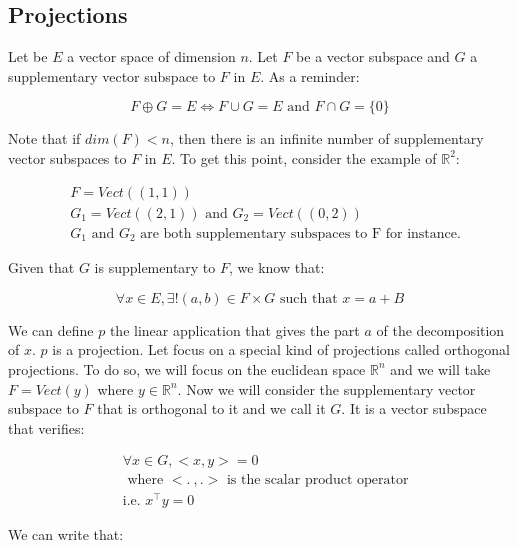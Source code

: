 \documentclass[a4paper, 12pt]{article}
\begin{document}
\subsection{Projections}

Let be $E$ a vector space of dimension $n$. Let $F$ be a vector subspace  and $G$ a supplementary vector subspace to $F$ in $E$. As a reminder:

\begin{equation}
F \oplus G = E \iff F \cup G = E \text{ and } F \cap G = \{0\}
\end{equation}

Note that if $dim(F)<n$, then there is an infinite number of supplementary vector subspaces to $F$ in $E$. To get this point, consider the example of $\mathbb{R}^{2}$:

\begin{align*}
& F = Vect((1,1)) \\
& G_1 = Vect((2,1)) \text{ and } G_2 = Vect((0, 2)) \\
& G_1 \text{ and } G_2 \text{ are both supplementary subspaces to F for instance.}
\end{align*}

Given that $G$ is supplementary to $F$, we know that:

\begin{equation}
\forall x \in E, \exists! (a, b) \in F \times G \text{ such that } x = a +B
\end{equation}

We can define $p$ the linear application that gives the part $a$ of the decomposition of $x$. $p$ is a projection. Let focus on a special kind of projections called orthogonal projections. To do so, we will focus on the euclidean space $\mathbb{R}^{n}$ and we will take $F=Vect(y)$ where $y \in \mathbb{R}^{n}$. Now we will consider the supplementary vector subspace to $F$ that is orthogonal to it and we call it $G$. It is a vector subspace that verifies:

\begin{align*}
& \forall x \in G, <x, y> = 0 \\
& \text{ where } <. \: , .> \text{ is the scalar product operator} \\ 
& \text{i.e. } x^{\top}y = 0
\end{align*}

We can write that:
\end{document}
